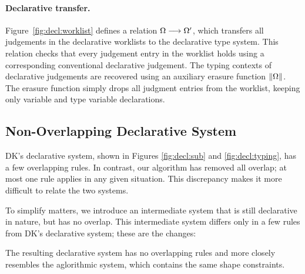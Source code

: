 \paragraph{Declarative transfer.}
Figure~\ref{fig:decl:worklist} defines a relation $\Omega \longrightarrow \Omega'$,
which transfers all judgements in the declarative worklists to the
declarative type system. This relation checks that every judgement entry in the worklist
holds using a corresponding conventional declarative judgement. 
The typing contexts of declarative judgements are recovered using an
auxiliary erasure function $\|\Omega\|$. The erasure function
simply drops all judgment entries from the worklist, keeping only variable
and type variable declarations.

\subsection{Non-Overlapping Declarative System}
\label{sec:metatheory:non-overlapping}

DK's declarative system, shown in Figures \ref{fig:decl:sub} and
\ref{fig:decl:typing}, has a few overlapping rules. In contrast, our algorithm
has removed all overlap; at most one rule applies in any given situation.
This discrepancy makes it more difficult to relate the two systems.

To simplify matters, we introduce an intermediate system that is still declarative
in nature, but has no overlap. This intermediate system differs only in a few 
rules from DK's declarative system; these are the changes:
The resulting declarative system has no overlapping rules
and more closely resembles the aglorithmic system, which contains
the same shape constraints.

